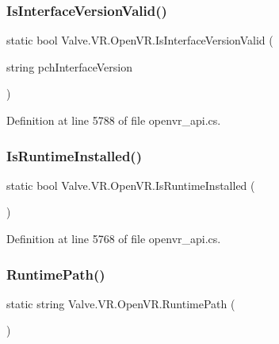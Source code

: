 \subsubsection{\texorpdfstring{IsInterfaceVersionValid()}{IsInterfaceVersionValid()}}
{\footnotesize\ttfamily static bool Valve.\+V\+R.\+Open\+V\+R.\+Is\+Interface\+Version\+Valid (\begin{DoxyParamCaption}\item[{string}]{pch\+Interface\+Version }\end{DoxyParamCaption})\hspace{0.3cm}{\ttfamily [static]}}



Definition at line 5788 of file openvr\+\_\+api.\+cs.

\mbox{\label{class_valve_1_1_v_r_1_1_open_v_r_afcddd1daf2a59e882134e25a4368abd1}} 
\subsubsection{\texorpdfstring{IsRuntimeInstalled()}{IsRuntimeInstalled()}}
{\footnotesize\ttfamily static bool Valve.\+V\+R.\+Open\+V\+R.\+Is\+Runtime\+Installed (\begin{DoxyParamCaption}{ }\end{DoxyParamCaption})\hspace{0.3cm}{\ttfamily [static]}}



Definition at line 5768 of file openvr\+\_\+api.\+cs.

\mbox{\label{class_valve_1_1_v_r_1_1_open_v_r_a1281abfb0a2afa7a761f0b4a5c8bb056}} 
\subsubsection{\texorpdfstring{RuntimePath()}{RuntimePath()}}
{\footnotesize\ttfamily static string Valve.\+V\+R.\+Open\+V\+R.\+Runtime\+Path (\begin{DoxyParamCaption}{ }\end{DoxyParamCaption})\hspace{0.3cm}{\ttfamily [static]}}



